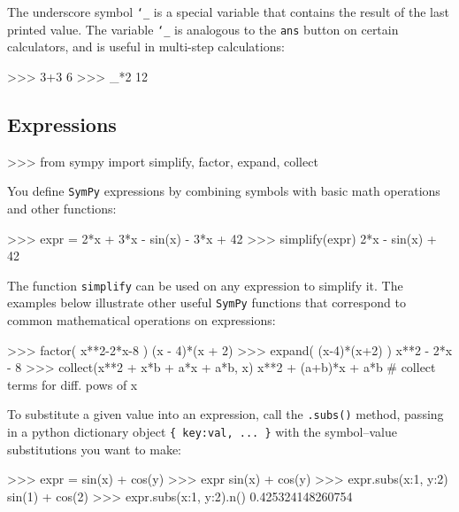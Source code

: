 The underscore symbol \texttt{\char`_} is a special variable that contains the result of the last printed value.
The variable \texttt{\char`_} is analogous to the \texttt{ans} button on certain calculators,
and is useful in multi-step calculations:

\small
\begin{verbatimtab}
>>> 3+3
6
>>> _*2
12
\end{verbatimtab}
\normalsize


\subsection{Expressions}
\label{basics:expressions}

\small
\begin{verbatimtab}
>>> from sympy import simplify, factor, expand, collect
\end{verbatimtab}
\normalsize

\noindent
You define \texttt{SymPy} expressions by combining symbols
with basic math operations and other functions: 

\small
\begin{verbatimtab}
>>> expr = 2*x + 3*x - sin(x) - 3*x + 42
>>> simplify(expr)
2*x - sin(x) + 42
\end{verbatimtab}
\normalsize

\noindent
The function \texttt{simplify} can be used on any expression to simplify it.
The examples below illustrate other useful \texttt{SymPy} functions
that correspond to common mathematical operations on expressions: 

\small
\begin{verbatimtab}
>>> factor( x**2-2*x-8 )
(x - 4)*(x + 2)
>>> expand( (x-4)*(x+2) )
x**2 - 2*x - 8
>>> collect(x**2 + x*b + a*x + a*b, x)
x**2 + (a+b)*x + a*b     # collect terms for diff. pows of x 
\end{verbatimtab}
\normalsize

\noindent
To substitute a given value into an expression,
call the \texttt{.subs()} method, passing in a python dictionary object \texttt{\{ key:val, ... \}} 
with the symbol--value substitutions you want to make:

\small
\begin{verbatimtab}
>>> expr  = sin(x) + cos(y)
>>> expr
sin(x) + cos(y)
>>> expr.subs({x:1, y:2})
sin(1) + cos(2)
>>> expr.subs({x:1, y:2}).n()
0.425324148260754
\end{verbatimtab}
\normalsize

